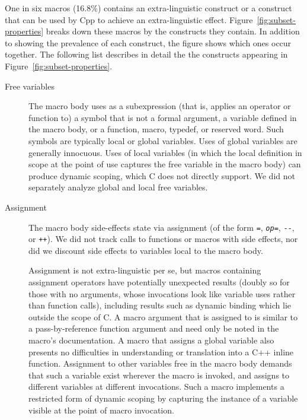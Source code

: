 \documentclass[10pt]{article}
\begin{document}
One in six macros (16.8\%) contains an extra-linguistic construct or a
construct that can be used by Cpp to achieve an extra-linguistic effect.
Figure~\ref{fig:subset-properties} breaks down these macros by the
constructs they contain.  In addition to showing the prevalence of each
construct, the figure shows which ones occur together.  The following list
describes in detail the the constructs appearing in
Figure~\ref{fig:subset-properties}.


\label{desc:properties}

\begin{description}
\item[Free variables]\label{page:freevar}
  The macro body uses as a subexpression (that is, applies an operator or
  function to) a symbol that is not a formal argument, a variable defined
  in the macro body, or a function, macro, typedef, or reserved word.  Such
  symbols are typically local or global variables.  Uses of global
  variables are generally innocuous.  Uses of local variables (in which the
  local definition in scope at the point of use captures the free variable
  in the macro body) can produce dynamic scoping, which C does
  not directly support.  We did not separately analyze global and local
  free variables.

\item[Assignment]
  The macro body side-effects state via assignment (of the form {\tt =},
  {\tt {\em op}=}, {\tt -{}-}, or {\tt ++}).  We did not track calls to
  functions or macros with side effects, nor did we discount side
  effects to variables local to the macro body.  
  
  Assignment is not extra-linguistic per se, but macros containing
  assignment operators have potentially unexpected results (doubly so for
  those with no arguments, whose invocations look like variable uses rather
  than function calls), including results such as dynamic binding which lie
  outside the scope of C\@.  A macro argument that is assigned to is
  similar to a pass-by-reference function argument and need only be noted
  in the macro's documentation.  A macro that assigns a global variable
  also presents no difficulties in understanding or translation into a C++
  inline function.  Assignment to other variables free in the macro body
  demands that such a variable exist wherever the macro is invoked, and
  assigns to different variables at different invocations.  Such a macro
  implements a restricted form of dynamic scoping by capturing the instance
  of a variable visible at the point of macro invocation.


\end{description}
\end{document}
